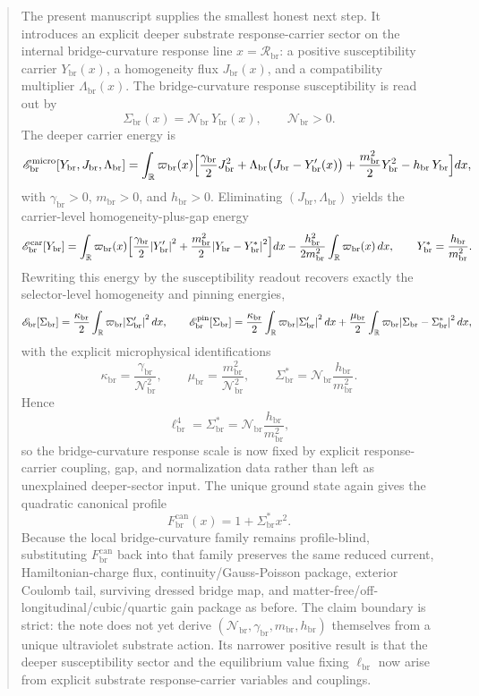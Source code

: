 \documentclass[11pt]{article}
\newcommand{\CurvScale}{\ell_{\mathrm{br}}}
\newcommand{\CurvProfileCan}{F_{\mathrm{br}}^{\mathrm{can}}}
\newcommand{\BridgeCurv}{\mathcal R_{\mathrm{br}}}
\newcommand{\ProfWeight}{\varpi_{\mathrm{br}}}
\newcommand{\RespSus}{\Sigma_{\mathrm{br}}}
\newcommand{\RespSusEq}{\Sigma_{\mathrm{br}}^{\ast}}
\newcommand{\RespEnergy}{\mathscr E_{\mathrm{br}}}
\newcommand{\RespEnergyPin}{\mathscr E_{\mathrm{br}}^{\mathrm{pin}}}
\newcommand{\RespStiff}{\kappa_{\mathrm{br}}}
\newcommand{\RespPin}{\mu_{\mathrm{br}}}
\newcommand{\RespCarrier}{Y_{\mathrm{br}}}
\newcommand{\RespCarrierEq}{Y_{\mathrm{br}}^{\ast}}
\newcommand{\RespFlux}{J_{\mathrm{br}}}
\newcommand{\RespCompat}{\Lambda_{\mathrm{br}}}
\newcommand{\RespNorm}{\mathcal N_{\mathrm{br}}}
\newcommand{\RespFluxCoeff}{\gamma_{\mathrm{br}}}
\newcommand{\RespGap}{m_{\mathrm{br}}}
\newcommand{\RespBias}{h_{\mathrm{br}}}
\newcommand{\RespMicroEnergy}{\mathscr E_{\mathrm{br}}^{\mathrm{micro}}}
\newcommand{\RespCarrierEnergy}{\mathscr E_{\mathrm{br}}^{\mathrm{car}}}
\begin{document}
\begin{abstract}
The present manuscript supplies the smallest honest next step. It introduces an explicit deeper substrate response-carrier sector on the internal bridge-curvature response line \(x=\BridgeCurv\): a positive susceptibility carrier \(\RespCarrier(x)\), a homogeneity flux \(\RespFlux(x)\), and a compatibility multiplier \(\RespCompat(x)\). The bridge-curvature response susceptibility is read out by
\[
\RespSus(x)=\RespNorm\,\RespCarrier(x),
\qquad
\RespNorm>0.
\]
The deeper carrier energy is
\[
\RespMicroEnergy[\RespCarrier,\RespFlux,\RespCompat]
=
\int_{\mathbb R}\ProfWeight(x)\Bigl[
\frac{\RespFluxCoeff}{2}\RespFlux^2
+\RespCompat\bigl(\RespFlux-\RespCarrier'(x)\bigr)
+\frac{\RespGap^2}{2}\RespCarrier^2
-\RespBias\,\RespCarrier
\Bigr]dx,
\]
with \(\RespFluxCoeff>0\), \(\RespGap>0\), and \(\RespBias>0\). Eliminating \((\RespFlux,\RespCompat)\) yields the carrier-level homogeneity-plus-gap energy
\[
\RespCarrierEnergy[\RespCarrier]
=
\int_{\mathbb R}\ProfWeight(x)\Bigl[
\frac{\RespFluxCoeff}{2}\abs{\RespCarrier'}^2
+\frac{\RespGap^2}{2}\abs{\RespCarrier-\RespCarrierEq}^2
\Bigr]dx
-\frac{\RespBias^2}{2\RespGap^2}\int_{\mathbb R}\ProfWeight(x)\,dx,
\qquad
\RespCarrierEq=\frac{\RespBias}{\RespGap^2}.
\]
Rewriting this energy by the susceptibility readout recovers exactly the selector-level homogeneity and pinning energies,
\[
\RespEnergy[\RespSus]
=
\frac{\RespStiff}{2}\int_{\mathbb R}\ProfWeight\abs{\RespSus'}^2\,dx,
\qquad
\RespEnergyPin[\RespSus]
=
\frac{\RespStiff}{2}\int_{\mathbb R}\ProfWeight\abs{\RespSus'}^2\,dx
+\frac{\RespPin}{2}\int_{\mathbb R}\ProfWeight\abs{\RespSus-\RespSusEq}^2\,dx,
\]
with the explicit microphysical identifications
\[
\RespStiff=\frac{\RespFluxCoeff}{\RespNorm^2},
\qquad
\RespPin=\frac{\RespGap^2}{\RespNorm^2},
\qquad
\RespSusEq=\RespNorm\frac{\RespBias}{\RespGap^2}.
\]
Hence
\[
\CurvScale^4=\RespSusEq=\RespNorm\frac{\RespBias}{\RespGap^2},
\]
so the bridge-curvature response scale is now fixed by explicit response-carrier coupling, gap, and normalization data rather than left as unexplained deeper-sector input. The unique ground state again gives the quadratic canonical profile
\[
\CurvProfileCan(x)=1+\RespSusEq x^2.
\]
Because the local bridge-curvature family remains profile-blind, substituting \(\CurvProfileCan\) back into that family preserves the same reduced current, Hamiltonian-charge flux, continuity/Gauss-Poisson package, exterior Coulomb tail, surviving dressed bridge map, and matter-free/off-longitudinal/cubic/quartic gain package as before. The claim boundary is strict: the note does not yet derive \((\RespNorm,\RespFluxCoeff,\RespGap,\RespBias)\) themselves from a unique ultraviolet substrate action. Its narrower positive result is that the deeper susceptibility sector and the equilibrium value fixing \(\CurvScale\) now arise from explicit substrate response-carrier variables and couplings.
\end{abstract}
\end{document}
